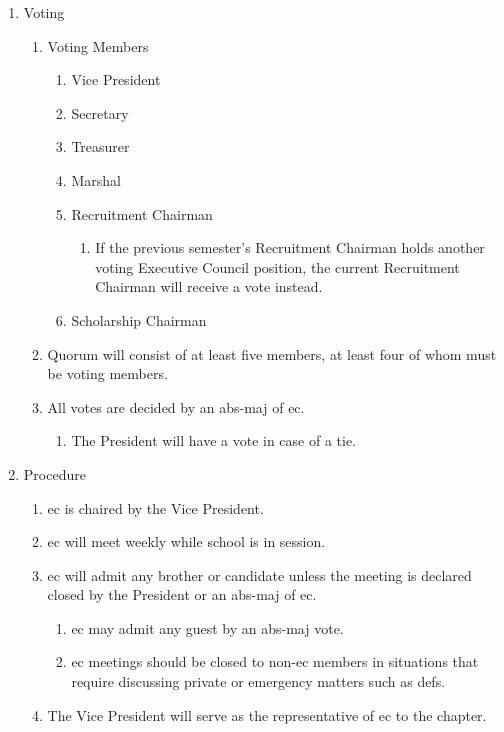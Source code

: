 \begin{enumerate}
		\item Voting
			\begin{enumerate}
				\item Voting Members
					\begin{enumerate}
						\item Vice President
						\item Secretary
						\item Treasurer
						\item Marshal
						\item Recruitment Chairman
							\begin{enumerate}
								\item If the previous semester's Recruitment Chairman holds another voting Executive Council position, the current Recruitment Chairman will receive a vote instead.
							\end{enumerate}
                        \item Scholarship Chairman
					\end{enumerate}
				\item Quorum will consist of at least five members, at least four of whom must be voting members.
				\item All votes are decided by an \gls{abs-maj} of \gls{ec}.
                \begin{enumerate}
                    \item The President will have a vote in case of a tie.
                \end{enumerate}
			\end{enumerate}
		\item Procedure
			\begin{enumerate}
				\item \gls{ec} is chaired by the Vice President.
				\item \gls{ec} will meet weekly while school is in session.
				\item \gls{ec} will admit any brother or candidate unless the meeting is declared closed by the President or an \gls{abs-maj} of \gls{ec}.
					\begin{enumerate}
                        \item \gls{ec} may admit any guest by an \gls{abs-maj} vote.
						\item \gls{ec} meetings should be closed to non-\gls{ec} members in situations that require discussing private or emergency matters such as \glspl{def}.
					\end{enumerate}
				\item The Vice President will serve as the representative of \gls{ec} to the chapter.
			\end{enumerate} 
	\end{enumerate}

